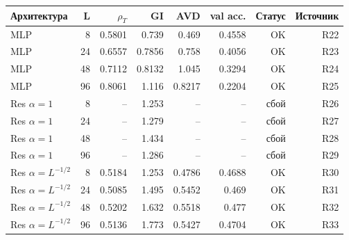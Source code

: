 \begin{tabular}{lrrrrrrr}
\toprule
Архитектура & L & $\rho_T$ & GI & AVD & val acc. & Статус & Источник \\
\midrule
MLP & 8 & 0.5801 & 0.739 & 0.469 & 0.4558 & OK & R22 \\
MLP & 24 & 0.6557 & 0.7856 & 0.758 & 0.4056 & OK & R23 \\
MLP & 48 & 0.7112 & 0.8132 & 1.045 & 0.3294 & OK & R24 \\
MLP & 96 & 0.8061 & 1.116 & 0.8217 & 0.2204 & OK & R25 \\
Res $\alpha=1$ & 8 & -- & 1.253 & -- & -- & сбой & R26 \\
Res $\alpha=1$ & 24 & -- & 1.279 & -- & -- & сбой & R27 \\
Res $\alpha=1$ & 48 & -- & 1.434 & -- & -- & сбой & R28 \\
Res $\alpha=1$ & 96 & -- & 1.286 & -- & -- & сбой & R29 \\
Res $\alpha=L^{-1/2}$ & 8 & 0.5184 & 1.253 & 0.4786 & 0.4688 & OK & R30 \\
Res $\alpha=L^{-1/2}$ & 24 & 0.5085 & 1.495 & 0.5452 & 0.469 & OK & R31 \\
Res $\alpha=L^{-1/2}$ & 48 & 0.5202 & 1.632 & 0.5518 & 0.477 & OK & R32 \\
Res $\alpha=L^{-1/2}$ & 96 & 0.5136 & 1.773 & 0.5427 & 0.4704 & OK & R33 \\
\bottomrule
\end{tabular}